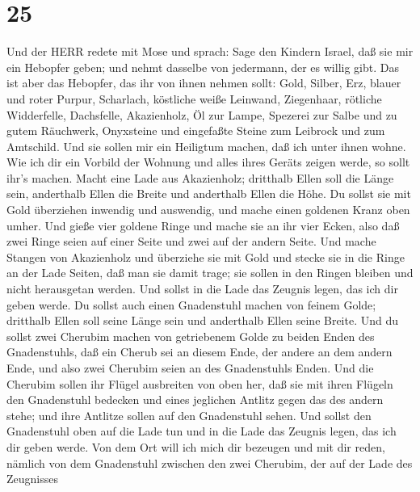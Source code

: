 \hypertarget{section-24}{%
\section{25}\label{section-24}}

 Und der HERR redete mit Mose und sprach:  Sage
den Kindern Israel, daß sie mir ein Hebopfer geben; und nehmt dasselbe
von jedermann, der es willig gibt.  Das ist aber das
Hebopfer, das ihr von ihnen nehmen sollt: Gold, Silber, Erz,
 blauer und roter Purpur, Scharlach, köstliche weiße
Leinwand, Ziegenhaar,  rötliche Widderfelle, Dachsfelle,
Akazienholz,  Öl zur Lampe, Spezerei zur Salbe und zu gutem
Räuchwerk,  Onyxsteine und eingefaßte Steine zum Leibrock
und zum Amtschild.  Und sie sollen mir ein Heiligtum machen,
daß ich unter ihnen wohne.  Wie ich dir ein Vorbild der
Wohnung und alles ihres Geräts zeigen werde, so sollt ihr's machen.
 Macht eine Lade aus Akazienholz; dritthalb Ellen soll die
Länge sein, anderthalb Ellen die Breite und anderthalb Ellen die Höhe.
 Du sollst sie mit Gold überziehen inwendig und auswendig,
und mache einen goldenen Kranz oben umher.  Und gieße vier
goldene Ringe und mache sie an ihr vier Ecken, also daß zwei Ringe seien
auf einer Seite und zwei auf der andern Seite.  Und mache
Stangen von Akazienholz und überziehe sie mit Gold  und
stecke sie in die Ringe an der Lade Seiten, daß man sie damit trage;
 sie sollen in den Ringen bleiben und nicht herausgetan
werden.  Und sollst in die Lade das Zeugnis legen, das ich
dir geben werde.  Du sollst auch einen Gnadenstuhl machen
von feinem Golde; dritthalb Ellen soll seine Länge sein und anderthalb
Ellen seine Breite.  Und du sollst zwei Cherubim machen von
getriebenem Golde zu beiden Enden des Gnadenstuhls,  daß
ein Cherub sei an diesem Ende, der andere an dem andern Ende, und also
zwei Cherubim seien an des Gnadenstuhls Enden.  Und die
Cherubim sollen ihr Flügel ausbreiten von oben her, daß sie mit ihren
Flügeln den Gnadenstuhl bedecken und eines jeglichen Antlitz gegen das
des andern stehe; und ihre Antlitze sollen auf den Gnadenstuhl sehen.
 Und sollst den Gnadenstuhl oben auf die Lade tun und in
die Lade das Zeugnis legen, das ich dir geben werde.  Von
dem Ort will ich mich dir bezeugen und mit dir reden, nämlich von dem
Gnadenstuhl zwischen den zwei Cherubim, der auf der Lade des Zeugnisses
